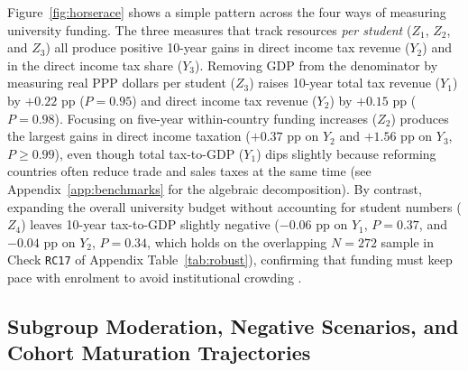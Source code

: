 \documentclass[11pt,a4paper]{article}
\begin{document}
Figure~\ref{fig:horserace} shows a simple pattern across the four ways of measuring university funding. The three measures that track resources \emph{per student} ($Z_1$, $Z_2$, and $Z_3$) all produce positive 10-year gains in direct income tax revenue ($Y_2$) and in the direct income tax share ($Y_3$). Removing GDP from the denominator by measuring real PPP dollars per student ($Z_3$) raises 10-year total tax revenue ($Y_1$) by $+0.22$ pp ($P = 0.95$) and direct income tax revenue ($Y_2$) by $+0.15$ pp ($P = 0.98$). Focusing on five-year within-country funding increases ($Z_2$) produces the largest gains in direct income taxation ($+0.37$ pp on $Y_2$ and $+1.56$ pp on $Y_3$, $P \ge 0.99$), even though total tax-to-GDP ($Y_1$) dips slightly because reforming countries often reduce trade and sales taxes at the same time (see Appendix~\ref{app:benchmarks} for the algebraic decomposition). By contrast, expanding the overall university budget without accounting for student numbers ($Z_4$) leaves 10-year tax-to-GDP slightly negative ($-0.06$ pp on $Y_1$, $P = 0.37$, and $-0.04$ pp on $Y_2$, $P = 0.34$, which holds on the overlapping $N = 272$ sample in Check \texttt{RC17} of Appendix Table~\ref{tab:robust}), confirming that funding must keep pace with enrolment to avoid institutional crowding \citep{bound2010have, deming2017impact, chakrabarti2020state}.

\subsection{Subgroup Moderation, Negative Scenarios, and Cohort Maturation Trajectories}
\end{document}

